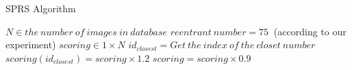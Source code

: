 \documentclass[letterpaper]{article}
\begin{document}
\begin{algorithm}[h]
  \caption{SPRS Algorithm}
  \begin{algorithmic}[2]  	
	\State $N\in the\ number\ of\ images\ in\ database$       
	\State $reentrant\ number = 75\ $ \State (according to our experiment)
    \State $scoring \in 1 \times N$
    	 	\State $id_{closest}= Get\ the\ index\ of\ the\ closet\ number$
    	 	\State $scoring(id_{closest})=scoring \times 1.2$    	 	      		
         \EndFor
         \State $scoring = scoring \times 0.9$
         
    \EndFor 

  \end{algorithmic}
\end{algorithm}
\end{document}
